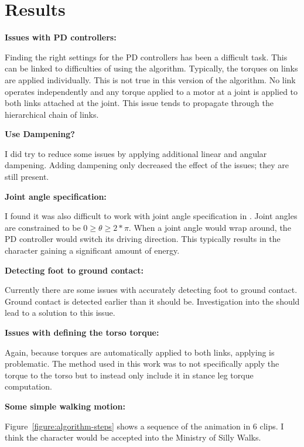 

\section{Results}
\label{sec:results}


	\noindent \textbf{Issues with PD controllers:}
	
	Finding the right settings for the PD controllers has been a difficult task. 
	This can be linked to difficulties of using the \Featherstone algorithm. 
	Typically, the torques on links are applied individually. 
	This is not true in this version of the \Featherstone algorithm. 
	No link operates independently and any torque applied to a motor at a joint is applied to both links attached at the joint. 
	This issue tends to propagate through the hierarchical chain of links. 
	
	\noindent \textbf{Use Dampening?}
	
	I did try to reduce some issues by applying additional linear and angular dampening. 
	Adding dampening only decreased the effect of the issues; they are still present.
	
	\noindent \textbf{Joint angle specification:}
	
	I found it was also difficult to work with joint angle specification in \bulletPhysics. Joint angles are constrained to be $0 \geq \theta \geq 2*\pi $. When a joint angle would wrap around, the PD controller would switch its driving direction. This typically results in the character gaining a significant amount of energy.
	
	\noindent \textbf{Detecting foot to ground contact:}
	
	Currently there are some issues with accurately detecting foot to ground contact. Ground contact is detected earlier than it should be. Investigation into the \bulletPhysics should lead to a solution to this issue.
	
	\noindent \textbf{Issues with defining the torso torque:}
	
	Again, because torques are automatically applied to both links, applying \torqueTorso is problematic. The method used in this work was to not specifically apply the torque to the torso but to instead only include it in stance leg torque computation.
	
	\noindent \textbf{Some simple walking motion:}
	
	Figure~\ref{figure:algorithm-steps} shows a sequence of the animation in $6$ clips. I think the character would be accepted into the Ministry of Silly Walks.
	
